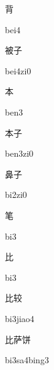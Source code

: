 \begin{verbete}[bei4]{背}
\begin{pronuncia}{bei4}
\end{pronuncia}
\end{verbete}

\begin{verbete}[bei4zi0]{被子}
\begin{pronuncia}{bei4zi0}
\end{pronuncia}
\end{verbete}

\begin{verbete}[ben3]{本}
\begin{pronuncia}{ben3}
\end{pronuncia}
\end{verbete}

\begin{verbete}[ben3zi0]{本子}
\begin{pronuncia}{ben3zi0}
\end{pronuncia}
\end{verbete}

\begin{verbete}[bi2zi0]{鼻子}
\begin{pronuncia}{bi2zi0}
\end{pronuncia}
\end{verbete}

\begin{verbete}[bi3]{笔}
\begin{pronuncia}{bi3}
\end{pronuncia}
\end{verbete}

\begin{verbete}[bi3]{比}
\begin{pronuncia}{bi3}
\end{pronuncia}
\end{verbete}

\begin{verbete}[bi3jiao4]{比较}
\begin{pronuncia}{bi3jiao4}
\end{pronuncia}
\end{verbete}

\begin{verbete}[bi3sa4bing3]{比萨饼}
\begin{pronuncia}{bi3sa4bing3}
\end{pronuncia}
\end{verbete}

